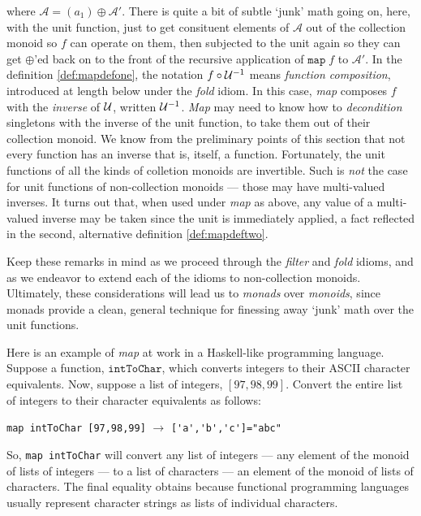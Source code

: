 where $\mathcal{A}=(a_1)\oplus\mathcal{A}'$. There is quite a bit of subtle `junk' math going on, here, with the unit function, just to get consituent elements of $\mathcal{A}$ out of the collection monoid so $f$ can operate on them, then subjected to the unit again so they can get $\oplus$'ed back on to the front of the recursive application of $\mathtt{map}\;f$ to $\mathcal{A}'$. In the definition \ref{def:mapdefone}, the notation $f\circ\mathcal{U}^{-1}$ means \emph{function composition}, introduced at length below under the \emph{fold} idiom. In this case, \emph{map} composes $f$ with the \emph{inverse} of $\mathcal{U}$, written $\mathcal{U}^{-1}$. \emph{Map} may need to know how to \emph{decondition} singletons with the inverse of the unit function, to take them out of their collection monoid. We know from the preliminary points of this section that not every function has an inverse that is, itself, a function. Fortunately, the unit functions of all the kinds of colletion monoids are invertible. Such is \emph{not} the case for unit functions of non-collection monoids --- those may have multi-valued inverses. It turns out that, when used under \emph{map} as above, any value of a multi-valued inverse may be taken since the unit is immediately applied, a fact reflected in the second, alternative definition \ref{def:mapdeftwo}.


Keep these remarks in mind as we proceed through the \emph{filter} and \emph{fold} idioms, and as we endeavor to extend each of the idioms to non-collection monoids. Ultimately, these considerations will lead us to \emph{monads} over \emph{monoids}, since monads provide a clean, general technique for finessing away `junk' math over the unit functions. 


Here is an example of \emph{map} at work in a Haskell-like programming language. Suppose a function, $\mathtt{intToChar}$, which converts integers to their ASCII character equivalents. Now, suppose a list of integers, $[97, 98, 99]$. Convert the entire list of integers to their character equivalents as follows:
\begin{center}
  \verb"map intToChar [97,98,99]" $\rightarrow$ \verb$['a','b','c']="abc"$
\end{center}
So, \verb"map intToChar" will convert any list of integers --- any element of the monoid of lists of integers --- to a list of characters --- an element of the monoid of lists of characters. The final equality obtains because functional programming languages usually represent character strings as lists of individual characters.


